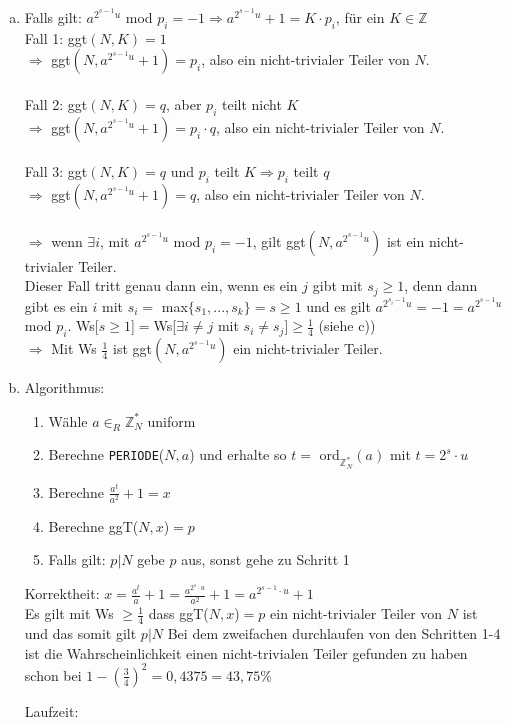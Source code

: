 \documentclass[a4paper]{scrartcl}
\begin{document}
\begin{enumerate}[a)]
\item
Falls gilt: $a^{2^{s-1}u}$ mod $p_i=-1 \Rightarrow a^{2^{s-1}u}+1=K\cdot p_i$, für ein $K\in \mathbb{Z}$\\
Fall 1: ggt$(N,K)=1$\\
$\Rightarrow$ ggt$(N, a^{2^{s-1}u}+1) = p_i$, also ein nicht-trivialer Teiler von $N$.\\\\

Fall 2: ggt$(N, K)=q$, aber $p_i$ teilt nicht $K$\\

$\Rightarrow$ ggt$(N, a^{2^{s-1}u}+1) = p_i \cdot q$, also ein nicht-trivialer Teiler von $N$. \\\\
 
Fall 3:  ggt$(N,K)=q$ und $p_i$ teilt $K \Rightarrow p_i$ teilt $q$ \\
$\Rightarrow$ ggt$(N, a^{2^{s-1}u}+1) = q$, also ein nicht-trivialer Teiler von $N$. \\\\

$\Rightarrow$ wenn $\exists i$, mit $a^{2^{s-1}u}$ mod $p_i=-1$, gilt ggt$(N, a^{2^{s-1}u})$ ist ein nicht-trivialer Teiler.\\
Dieser Fall tritt genau dann ein, wenn es ein $j$ gibt mit $s_j\geq 1$, denn dann gibt es ein $i$ mit $s_i=$ max$\{s_1, ..., s_k\}=s\geq 1$ und es gilt $a^{2^{s_i-1}u} =-1 = a^{2^{s-1}u}$ mod $p_i$.
Ws[$ s\geq 1$]$=$Ws[$\exists i \neq j$ mit $s_i \neq s_j$]$\geq\frac{1}{4}$ (siehe c))\\
$\Rightarrow$ Mit Ws $\frac{1}{4}$ ist ggt$(N, a^{2^{s-1}u})$ ein nicht-trivialer Teiler.



\item
Algorithmus:\\
\begin{enumerate}[1.]
\item Wähle $a\in_R \mathbb{Z}_N^*$ uniform
\item Berechne \texttt{PERIODE}($N,a$) und erhalte so $t =$ ord$_{\mathbb{Z}_N^*}(a)$ mit $t=2^s\cdot u$
\item Berechne $\frac{a^t}{a^2}+1=x$
\item Berechne ggT($N, x$)$=p$
\item Falls gilt: $p | N$ gebe $p$ aus, sonst gehe zu Schritt 1
\end{enumerate}

Korrektheit:
$x=\frac{a^t}{a}+1= \frac{a^{2^s\cdot u}}{a^2}+1= a^{2^{s-1}\cdot u}+1$\\
Es gilt mit Ws $\geq \frac{1}{4}$ dass ggT($N, x$)$=p$ ein nicht-trivialer Teiler von $N$ ist und das somit gilt $p|N$
Bei dem zweifachen durchlaufen von den Schritten 1-4 ist die Wahrscheinlichkeit einen nicht-trivialen Teiler gefunden zu haben schon bei $1-(\frac{3}{4})^2=0,4375=43,75 \%$

Laufzeit:



\end{enumerate}
\end{document}
